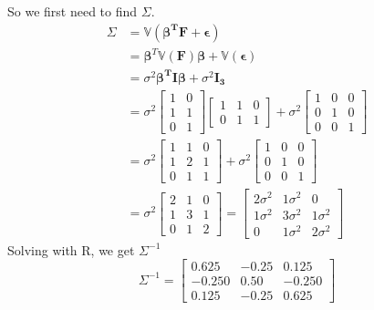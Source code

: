 \documentclass[
  oneside]{book}
\begin{document}
So we first need to find \(\Sigma\).
\[
\begin{aligned}
\Sigma &= \mathbb{V}(\mathbf{\beta^{T}F+\epsilon})\\
&= \mathbf{\beta}^{T}\mathbb{V}(\mathbf{F})\mathbf{\beta} + \mathbb{V}(\mathbf{\epsilon})\\
&= \sigma^{2} \mathbf{\beta^{T}}\mathbf{I}\mathbf{\beta} + \sigma^{2}\mathbf{I_{3}}\\
&= \sigma^{2} \left[\begin{array}{ll}
1 & 0 \\
1 & 1 \\
0 & 1
\end{array}\right]\left[\begin{array}{lll}
1 & 1 & 0 \\
0 & 1 & 1
\end{array}\right] + \sigma^{2}\left[\begin{array}{lll}
1 & 0  & 0\\
0 & 1  & 0\\
0 & 0 & 1
\end{array}\right]\\
&= \sigma^{2} \left[\begin{array}{lll}
1 & 1 & 0 \\
1 & 2 & 1 \\
0 & 1 & 1
\end{array}\right] + \sigma^{2}\left[\begin{array}{lll}
1 & 0  & 0\\
0 & 1  & 0\\
0 & 0 & 1
\end{array}\right]\\
&= \sigma^{2}\left[\begin{array}{lll}
2 & 1 & 0 \\
1 & 3 & 1 \\
0 & 1 & 2
\end{array}\right] = \left[\begin{array}{lll}
2\sigma^{2} & 1\sigma^{2} & 0 \\
1\sigma^{2} & 3\sigma^{2} & 1 \sigma^{2}\\
0 & 1\sigma^{2} & 2\sigma^{2}
\end{array}\right]
\end{aligned}
\]
Solving with R, we get \(\Sigma ^{-1}\)
\[
\Sigma ^{-1} = \left[ 
\begin{array}{ccc}
0.625 & -0.25 & 0.125 \\
-0.250 & 0.50 & -0.250\\
0.125 & -0.25 & 0.625
\end{array} \right] 
\]
\end{document}
